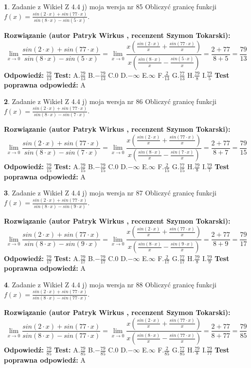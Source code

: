 \documentclass[12pt, a4paper]{article}
\theoremstyle{definition} %
\newtheorem{zad}{}
\newcommand{\zadStart}[1]{\begin{zad}#1\newline}
\newcommand{\zadStop}{\end{zad}}
\newcommand{\rozwStart}[2]{\noindent \textbf{Rozwiązanie (autor #1 , recenzent #2): }\newline}
\newcommand{\rozwStop}{\newline}
\newcommand{\odpStart}{\noindent \textbf{Odpowiedź:}\newline}
\newcommand{\odpStop}{\newline}
\newcommand{\testStart}{\noindent \textbf{Test:}\newline}
\newcommand{\testStop}{\newline}
\newcommand{\kluczStart}{\noindent \textbf{Test poprawna odpowiedź:}\newline}
\newcommand{\kluczStop}{\newline}
\begin{document}
\zadStart{Zadanie z Wikieł Z 4.4 j) moja wersja nr 85}
Obliczyć granicę funkcji $f(x)=\frac{sin(2\cdot x) +sin(77\cdot x)}{sin(8\cdot x) -sin(5\cdot x)}$.
\zadStop
\rozwStart{Patryk Wirkus}{Szymon Tokarski}
$$\lim\limits_{x\to 0}\frac{sin(2\cdot x) +sin(77\cdot x)}{sin(8\cdot x) -sin(5\cdot x)}=\lim\limits_{x\to 0}\frac{x(\frac{sin(2\cdot x)}{x}+\frac{sin(77\cdot x)}{x})}{x(\frac{sin(8\cdot x)}{x}-\frac{sin(5\cdot x)}{x})}=\frac{2+77}{8+5} = \frac{79}{13}$$
\rozwStop
\odpStart
$\frac{79}{13}$
\odpStop
\testStart
A.$\frac{79}{13}$
B.$-\frac{79}{13}$
C.$0$
D.$-\infty$
E.$\infty$
F.$\frac{2}{13}$
G.$\frac{77}{13}$
H.$\frac{79}{8}$
I.$\frac{79}{5}$
\testStop
\kluczStart
A
\kluczStop



\zadStart{Zadanie z Wikieł Z 4.4 j) moja wersja nr 86}
Obliczyć granicę funkcji $f(x)=\frac{sin(2\cdot x) +sin(77\cdot x)}{sin(8\cdot x) -sin(7\cdot x)}$.
\zadStop
\rozwStart{Patryk Wirkus}{Szymon Tokarski}
$$\lim\limits_{x\to 0}\frac{sin(2\cdot x) +sin(77\cdot x)}{sin(8\cdot x) -sin(7\cdot x)}=\lim\limits_{x\to 0}\frac{x(\frac{sin(2\cdot x)}{x}+\frac{sin(77\cdot x)}{x})}{x(\frac{sin(8\cdot x)}{x}-\frac{sin(7\cdot x)}{x})}=\frac{2+77}{8+7} = \frac{79}{15}$$
\rozwStop
\odpStart
$\frac{79}{15}$
\odpStop
\testStart
A.$\frac{79}{15}$
B.$-\frac{79}{15}$
C.$0$
D.$-\infty$
E.$\infty$
F.$\frac{2}{15}$
G.$\frac{77}{15}$
H.$\frac{79}{8}$
I.$\frac{79}{7}$
\testStop
\kluczStart
A
\kluczStop



\zadStart{Zadanie z Wikieł Z 4.4 j) moja wersja nr 87}
Obliczyć granicę funkcji $f(x)=\frac{sin(2\cdot x) +sin(77\cdot x)}{sin(8\cdot x) -sin(9\cdot x)}$.
\zadStop
\rozwStart{Patryk Wirkus}{Szymon Tokarski}
$$\lim\limits_{x\to 0}\frac{sin(2\cdot x) +sin(77\cdot x)}{sin(8\cdot x) -sin(9\cdot x)}=\lim\limits_{x\to 0}\frac{x(\frac{sin(2\cdot x)}{x}+\frac{sin(77\cdot x)}{x})}{x(\frac{sin(8\cdot x)}{x}-\frac{sin(9\cdot x)}{x})}=\frac{2+77}{8+9} = \frac{79}{17}$$
\rozwStop
\odpStart
$\frac{79}{17}$
\odpStop
\testStart
A.$\frac{79}{17}$
B.$-\frac{79}{17}$
C.$0$
D.$-\infty$
E.$\infty$
F.$\frac{2}{17}$
G.$\frac{77}{17}$
H.$\frac{79}{8}$
I.$\frac{79}{9}$
\testStop
\kluczStart
A
\kluczStop



\zadStart{Zadanie z Wikieł Z 4.4 j) moja wersja nr 88}
Obliczyć granicę funkcji $f(x)=\frac{sin(2\cdot x) +sin(77\cdot x)}{sin(8\cdot x) -sin(77\cdot x)}$.
\zadStop
\rozwStart{Patryk Wirkus}{Szymon Tokarski}
$$\lim\limits_{x\to 0}\frac{sin(2\cdot x) +sin(77\cdot x)}{sin(8\cdot x) -sin(77\cdot x)}=\lim\limits_{x\to 0}\frac{x(\frac{sin(2\cdot x)}{x}+\frac{sin(77\cdot x)}{x})}{x(\frac{sin(8\cdot x)}{x}-\frac{sin(77\cdot x)}{x})}=\frac{2+77}{8+77} = \frac{79}{85}$$
\rozwStop
\odpStart
$\frac{79}{85}$
\odpStop
\testStart
A.$\frac{79}{85}$
B.$-\frac{79}{85}$
C.$0$
D.$-\infty$
E.$\infty$
F.$\frac{2}{85}$
G.$\frac{77}{85}$
H.$\frac{79}{8}$
I.$\frac{79}{77}$
\testStop
\kluczStart
A
\kluczStop
\end{document}
